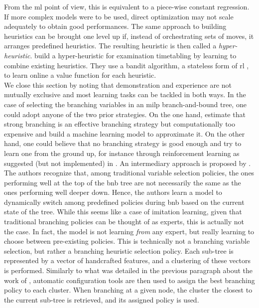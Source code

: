 \documentclass[11pt]{article}
\begin{document}
		From the \gls{ml} point of view, this is equivalent to a piece-wise constant regression.
		If more complex models were to be used, direct optimization may not scale adequately to obtain good
		performances.
		The same approach to building heuristics can be brought one level up if, instead of orchestrating
		sets of moves, it arranges predefined heuristics.
		The resulting heuristic is then called a \textit{hyper-heuristic}.
		\cite{OzcanReinforcement2012} build a hyper-heuristic for examination timetabling
		by learning to combine existing heuristics.
		They use a bandit algorithm, a stateless form of \gls{rl}
		\citep[see][Chapter~2]{sutton2018reinforcement}, to learn online a value function for each
		heuristic.
		\\

		We close this section by noting that demonstration and experience are not mutually exclusive and
		most learning tasks can be tackled in both ways.
		In the case of selecting the branching variables in an \gls{milp} branch-and-bound tree, one could
		adopt anyone of the two prior strategies.
		On the one hand, \cite{MarcosAlvarezsupervisedmachinelearning2014,
		MarcosAlvarezOnlineLearningStrong2016, MarcosAlvarezMachineLearningBasedApproximation2017,
		KhalilLearningbranchmixed2016} estimate that strong branching is an effective branching strategy
		but computationally too expensive and build a machine learning model to approximate it.
		On the other hand, one could believe that no branching strategy is good enough and try to learn one
		from the ground up, for instance through reinforcement learning as suggested (but not implemented)
		in \cite{KhalilLearningbranchmixed2016}.
		An intermediary approach is proposed by \cite{LibertoDash2016}.
		The authors recognize that, among traditional variable selection policies, the ones performing well
		at the top of the \gls{bnb} tree are not necessarily the same as the ones performing well deeper
		down.
		Hence, the authors learn a model to dynamically switch among predefined policies during \gls{bnb}
		based on the current state of the tree.
		While this seems like a case of imitation learning, given that traditional branching policies can
		be thought of as experts, this is actually not the case.
		In fact, the model is not learning \emph{from} any expert, but really learning to choose between
		pre-existing policies.
		This is technically not a branching variable selection, but rather a branching heuristic selection
		policy.
		Each sub-tree is represented by a vector of handcrafted features, and a clustering of these vectors
		is performed.
		Similarly to what was detailed in the previous paragraph about the work of
		\cite{KarapetyanMarkov2017, MasciaGrammar2014}, automatic configuration tools are then used to
		assign the best branching policy to each cluster.
		When branching at a given node, the cluster the closest to the current sub-tree is retrieved,
		and its assigned policy is used.
\end{document}
